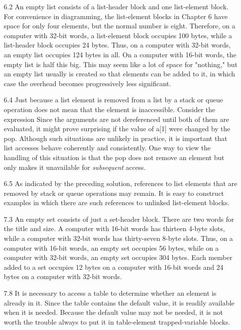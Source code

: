 \begin{itemize}
\goodbreak\item[6.2]
An empty list consists of a list-header block and one list-element block.
For convenience in diagramming, the list-element blocks in Chapter 6
have space for only four elements, but the normal number is eight. Therefore,
on a computer with 32-bit words, a list-element block occupies 100
bytes, while a list-header block occupies 24 bytes. Thus, on a computer
with 32-bit words, an empty list occupies 124 bytes in all. On a computer
with 16-bit words, the empty list is half this big. This may seem like a lot
of space for "nothing," but an empty list usually is created so that elements
can be added to it, in which case the overhead becomes progressively
less significant.

\goodbreak\item[6.4]
Just because a list element is removed from a list by a stack or queue
operation does not mean that the element is inaccessible. Consider the
expression
Since the arguments are not dereferenced until both of them are
evaluated, it might prove surprising if the value of a[1] were changed by
the pop. Although such situations are unlikely in practice, it is important
that list accesses behave coherently and consistently. One way to view
the handling of this situation is that the pop does not remove an element
but only makes it unavailable for {\em subsequent} access.

\goodbreak\item[6.5]
As indicated by the preceding solution, references to list elements that are
removed by stack or queue operations may remain. It is easy to construct
examples in which there are such references to unlinked list-element
blocks.

\goodbreak\item[7.3]
An empty set consists of just a set-header block. There are two words for
the title and size. A computer with 16-bit words has thirteen 4-byte slots,
while a computer with 32-bit words has thirty-seven 8-byte slots. Thus,
on a computer with 16-bit words, an empty set occupies 56 bytes, while
on a computer with 32-bit words, an empty set occupies 304 bytes. Each
member added to a set occupies 12 bytes on a computer with 16-bit words
and 24 bytes on a computer with 32-bit words.

\goodbreak\item[7.8]
It is necessary to access a table to determine whether an element is
already in it. Since the table contains the default value, it is readily available
when it is needed. Because the default value may not be needed, it is
not worth the trouble always to put it in table-element trapped-variable
blocks.


\end{itemize}
